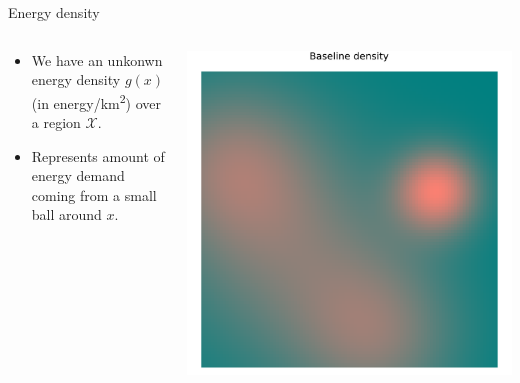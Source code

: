 \documentclass[aspectratio=169]{beamer}
\begin{document}
\begin{frame}{Energy density}

	\vfill
	\begin{columns}
		\begin{column}{0.5\textwidth}
	
			\begin{itemize}
				\item We have an unkonwn \alert{energy density} $g(x)$ (in energy/\si{km^2}) over a region $\mathcal{X}$.
				
				\vspace{1cm}
				\item Represents amount of energy demand coming from a small ball around $x$.
			
			\end{itemize}
	
		\end{column}
		\begin{column}{0.5\textwidth}
			\centering
			\includegraphics[width=0.9\columnwidth]{figuras/baseline_density.pdf}
		\end{column}
	\end{columns}
\end{frame}
\end{document}

